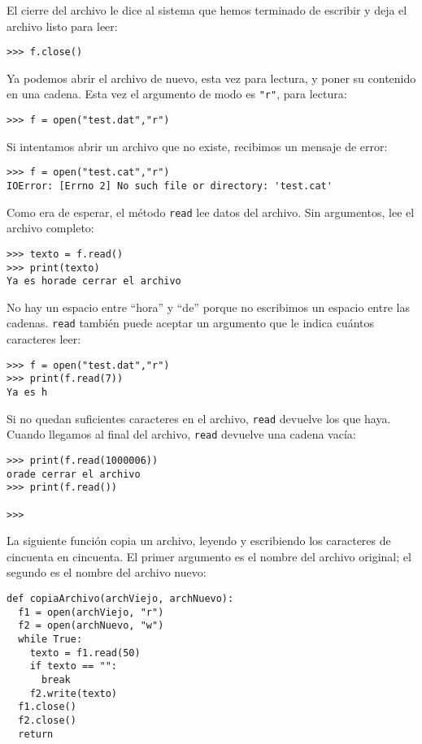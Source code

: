 El cierre del archivo le dice al sistema que hemos terminado de escribir
y deja el archivo listo para leer:
\begin{lstlisting}
>>> f.close()
\end{lstlisting}

Ya podemos abrir el archivo de nuevo, esta vez para lectura, y poner
su contenido en una cadena. Esta vez el argumento de modo es {\verb+"r"+},
para lectura:
\begin{lstlisting}
>>> f = open("test.dat","r")
\end{lstlisting}

Si intentamos abrir un archivo que no existe, recibimos un mensaje
de error:

\begin{lstlisting}
>>> f = open("test.cat","r")
IOError: [Errno 2] No such file or directory: 'test.cat'
\end{lstlisting}

Como era de esperar, el método \texttt{read} lee datos del archivo.
Sin argumentos, lee el archivo completo:
\begin{lstlisting}
>>> texto = f.read()
>>> print(texto)
Ya es horade cerrar el archivo
\end{lstlisting}

No hay un espacio entre ``hora'' y ``de'' porque no escribimos
un espacio entre las cadenas. \texttt{read} también puede aceptar
un argumento que le indica cuántos caracteres leer:
\begin{lstlisting}
>>> f = open("test.dat","r")
>>> print(f.read(7))
Ya es h
\end{lstlisting}

Si no quedan suficientes caracteres en el archivo, \texttt{read} devuelve
los que haya. Cuando llegamos al final del archivo, \texttt{read}
devuelve una cadena vacía:
\begin{lstlisting}
>>> print(f.read(1000006))
orade cerrar el archivo
>>> print(f.read())

>>>
\end{lstlisting}

La siguiente función copia un archivo, leyendo y escribiendo los caracteres
de cincuenta en cincuenta. El primer argumento es el nombre del archivo
original; el segundo es el nombre del archivo nuevo:
\begin{lstlisting}
def copiaArchivo(archViejo, archNuevo):
  f1 = open(archViejo, "r")
  f2 = open(archNuevo, "w")
  while True:
    texto = f1.read(50)
    if texto == "":
      break
    f2.write(texto)
  f1.close()
  f2.close()
  return
\end{lstlisting}

